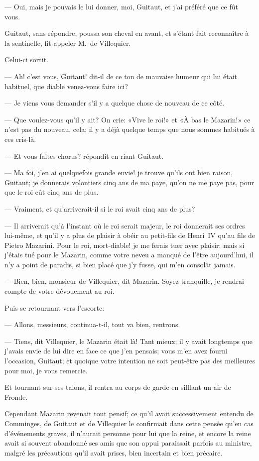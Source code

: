 — Oui, mais je pouvais le lui donner, moi, Guitaut, et j'ai préféré que ce fût vous.

Guitaut, sans répondre, poussa son cheval en avant, et s'étant fait reconnaître à la sentinelle, fit appeler M.~de Villequier.

Celui-ci sortit.

— Ah! c'est vous, Guitaut! dit-il de ce ton de mauvaise humeur qui lui était habituel, que diable venez-vous faire ici?

— Je viens vous demander s'il y a quelque chose de nouveau de ce côté.

— Que voulez-vous qu'il y ait? On crie: «Vive le roi!» et «À bas le Mazarin!» ce n'est pas du nouveau, cela; il y a déjà quelque temps que nous sommes habitués à ces cris-là.

— Et vous faites chorus? répondit en riant Guitaut.

— Ma foi, j'en ai quelquefois grande envie! je trouve qu'ils ont bien raison, Guitaut; je donnerais volontiers cinq ans de ma paye, qu'on ne me paye pas, pour que le roi eût cinq ans de plus.

— Vraiment, et qu'arriverait-il si le roi avait cinq ans de plus?

— Il arriverait qu'à l'instant où le roi serait majeur, le roi donnerait ses ordres lui-même, et qu'il y a plus de plaisir à obéir au petit-fils de Henri~IV qu'au fils de Pietro Mazarini. Pour le roi, mort-diable! je me ferais tuer avec plaisir; mais si j'étais tué pour le Mazarin, comme votre neveu a manqué de l'être aujourd'hui, il n'y a point de paradis, si bien placé que j'y fusse, qui m'en consolât jamais.

— Bien, bien, monsieur de Villequier, dit Mazarin. Soyez tranquille, je rendrai compte de votre dévouement au roi.

Puis se retournant vers l'escorte:

— Allons, messieurs, continua-t-il, tout va bien, rentrons.

— Tiens, dit Villequier, le Mazarin était là! Tant mieux; il y avait longtemps que j'avais envie de lui dire en face ce que j'en pensais; vous m'en avez fourni l'occasion, Guitaut; et quoique votre intention ne soit peut-être pas des meilleures pour moi, je vous remercie.

Et tournant sur ses talons, il rentra au corps de garde en sifflant un air de Fronde.

Cependant Mazarin revenait tout pensif; ce qu'il avait successivement entendu de Comminges, de Guitaut et de Villequier le confirmait dans cette pensée qu'en cas d'événements graves, il n'aurait personne pour lui que la reine, et encore la reine avait si souvent abandonné ses amis que son appui paraissait parfois au ministre, malgré les précautions qu'il avait prises, bien incertain et bien précaire.

